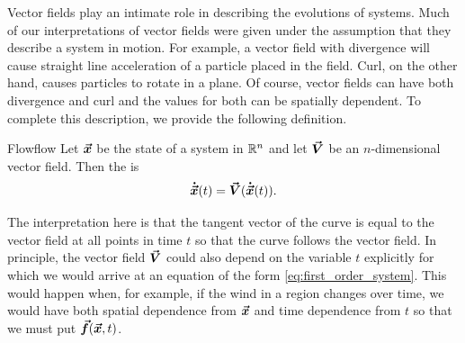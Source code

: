         Vector fields play an intimate role in describing the evolutions of systems. Much of our interpretations of vector fields were given under the assumption that they describe a system in motion. For example, a vector field with divergence will cause straight line acceleration of a particle placed in the field. Curl, on the other hand, causes particles to rotate in a plane. Of course, vector fields can have both divergence and curl and the values for both can be spatially dependent. To complete this description, we provide the following definition.

        \begin{df}{Flow}{flow}
        Let $\boldsymbol{\vec{x}}$ be the state of a system in $\mathbb{R}^n$ and let $\boldsymbol{\vec{V}}$ be an $n$-dimensional vector field. Then the  is
    \begin{equation}
    \boldsymbol{\dot{\vec{x}}}(t)= \boldsymbol{\vec{V}}(\boldsymbol{\dot{\vec{x}}}(t)).
    \end{equation}
        \end{df}

        The interpretation here is that the tangent vector of the curve is equal to the vector field at all points in time $t$ so that the curve follows the vector field. In principle, the vector field $\boldsymbol{\vec{V}}$ could also depend on the variable $t$ explicitly for which we would arrive at an equation of the form \cref{eq:first_order_system}. This would happen when, for example, if the wind in a region changes over time, we would have both spatial dependence from $\boldsymbol{\vec{x}}$ and time dependence from $t$ so that we must put $\boldsymbol{\vec{f}}(\boldsymbol{\vec{x}},t)$.

